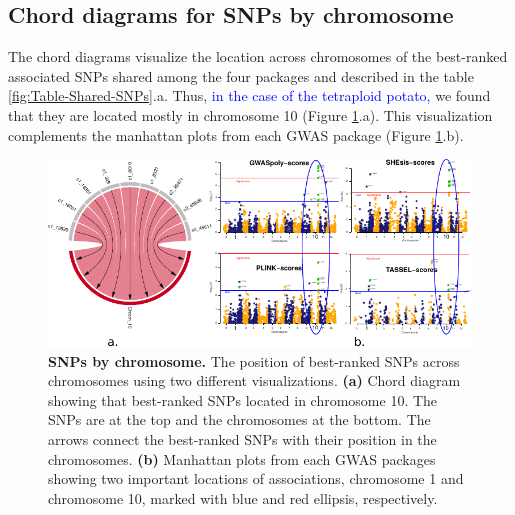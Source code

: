 \documentclass{article}
\begin{document}

\subsection{Chord diagrams for SNPs by chromosome}
The chord diagrams visualize the location across chromosomes 
of the best-ranked associated SNPs shared among the four packages and described in the table \ref{fig:Table-Shared-SNPs}.a.  Thus, \textcolor{blue}{in the case of the tetraploid potato,} we found that they are located mostly in chromosome 10  (Figure \ref{fig:Chord-diagrams}.a). This visualization complements the manhattan plots from each GWAS package (Figure \ref{fig:Chord-diagrams}.b).


\begin{figure}
\begin{centering}
\includegraphics{images/paper-chord-manhattans}
\par\end{centering}
\caption{\textbf{SNPs by chromosome.} The position of best-ranked SNPs across chromosomes using two different visualizations. \textbf{(a)} Chord diagram showing that best-ranked SNPs located in chromosome 10. The SNPs are at the top and the chromosomes at the bottom. The arrows connect the best-ranked SNPs with their position in the chromosomes. \textbf{(b)} Manhattan plots from each GWAS packages showing two important locations of associations, chromosome 1 and chromosome 10, marked with blue and red ellipsis, respectively. \label{fig:Chord-diagrams}}
\end{figure}
\end{document}
